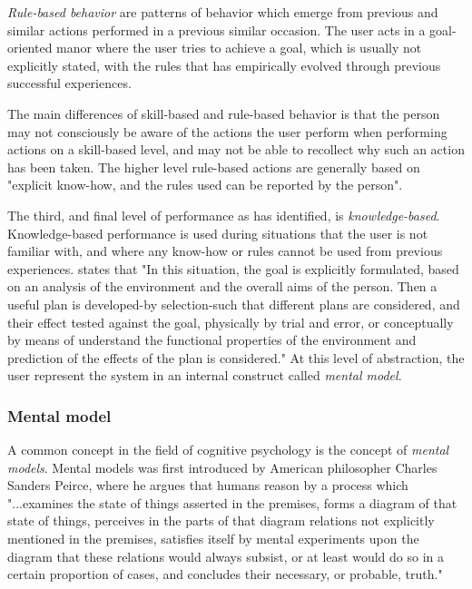 \textit{Rule-based behavior} are patterns of behavior which emerge from previous and similar actions performed in a previous similar occasion. The user acts in a goal-oriented manor where the user tries to achieve a goal, which is usually not explicitly stated, with the rules that has empirically evolved through previous successful experiences. 

The main differences of skill-based and rule-based behavior is that the person may not consciously be aware of the actions the user perform when performing actions on a skill-based level, and may not be able to recollect why such an action has been taken. The higher level rule-based actions are generally based on "explicit know-how, and the rules used can be reported by the person".

The third, and final level of performance as \cite{Rasmussen1983} has identified, is \textit{knowledge-based}. Knowledge-based performance is used during situations that the user is not familiar with, and where any know-how or rules cannot be used from previous experiences. \cite{Rasmussen1983} states that "In this situation, the goal is explicitly formulated, based on an analysis of the environment and the overall aims of the person. Then a useful plan is developed-by selection-such that different plans are considered, and their effect tested against the goal, physically by trial and error, or conceptually by means of understand the functional properties of the environment and prediction of the effects of the plan is considered." At this level of abstraction, the user represent the system in an internal construct called \textit{mental model}.

\subsubsection{Mental model}
A common concept in the field of cognitive psychology is the concept of \textit{mental models}. Mental models was first introduced by American philosopher Charles Sanders Peirce, where he argues that humans reason by a process which
"...examines the state of things
asserted in the premises, forms a diagram of that state of things, perceives in the parts of that diagram relations not explicitly mentioned in the premises, satisfies itself by mental experiments upon the diagram that these relations would always subsist, or at least would do so in a certain proportion of cases, and concludes their necessary, or probable, truth." \cite{Pierce1974}

